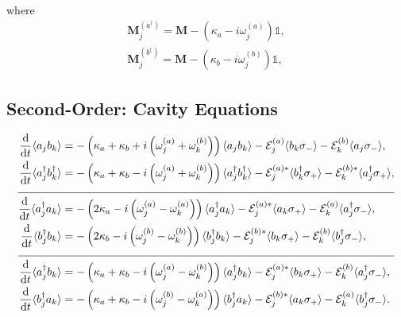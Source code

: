 \documentclass{article}
\newcommand{\ddt}[1][]{\frac{\mathrm{d} #1}{\mathrm{d}t}}
\begin{document}
where
\begin{subequations}
	\begin{gather}
		\bm{M}_{j}^{(a^{\dagger})} = \bm{M} - \left( \kappa_{a} - i \omega_{j}^{(a)} \right) \mathbb{1}, \\
		\bm{M}_{j}^{(b^{\dagger})} = \bm{M} - \left( \kappa_{b} - i \omega_{j}^{(b)} \right) \mathbb{1},
	\end{gather}
\end{subequations}

\subsection{Second-Order: Cavity Equations}

\begin{subequations}
	\begin{align}
		\ddt \langle a_{j} b_{k} \rangle &= -\left( \kappa_{a} + \kappa_{b} + i \left( \omega_{j}^{(a)} + \omega_{k}^{(b)} \right) \right) \langle a_{j} b_{k} \rangle - \mathcal{E}_{j}^{(a)} \langle b_{k} \sigma_{-} \rangle - \mathcal{E}_{k}^{(b)} \langle a_{j} \sigma_{-} \rangle, \\
		\ddt \langle a^{\dagger}_{j} b^{\dagger}_{k} \rangle &= -\left( \kappa_{a} + \kappa_{b} - i \left( \omega_{j}^{(a)} + \omega_{k}^{(b)} \right) \right) \langle a^{\dagger}_{j} b^{\dagger}_{k} \rangle - \mathcal{E}_{j}^{(a) *} \langle b^{\dagger}_{k} \sigma_{+} \rangle - \mathcal{E}_{k}^{(b) *} \langle a^{\dagger}_{j} \sigma_{+} \rangle, \\
		\cline{1-2}
		\ddt \langle a^{\dagger}_{j} a_{k} \rangle &= -\left( 2 \kappa_{a} - i \left( \omega_{j}^{(a)}- \omega_{k}^{(a)} \right) \right) \langle a^{\dagger}_{j} a_{k} \rangle - \mathcal{E}_{j}^{(a) *} \langle a_{k} \sigma_{+} \rangle - \mathcal{E}_{k}^{(a)} \langle a^{\dagger}_{j} \sigma_{-} \rangle, \\
		\ddt \langle b^{\dagger}_{j} b_{k} \rangle &= -\left( 2 \kappa_{b} - i \left( \omega_{j}^{(b)}- \omega_{k}^{(b)} \right) \right) \langle b^{\dagger}_{j} b_{k} \rangle - \mathcal{E}_{j}^{(b) *} \langle b_{k} \sigma_{+} \rangle - \mathcal{E}_{k}^{(b)} \langle b^{\dagger}_{j} \sigma_{-} \rangle, \\
		\cline{1-2}
		\ddt \langle a^{\dagger}_{j} b_{k} \rangle &= -\left( \kappa_{a} + \kappa_{b} - i \left( \omega_{j}^{(a)}- \omega_{k}^{(b)} \right) \right) \langle a^{\dagger}_{j} b_{k} \rangle - \mathcal{E}_{j}^{(a) *} \langle b_{k} \sigma_{+} \rangle - \mathcal{E}_{k}^{(b)} \langle a^{\dagger}_{j} \sigma_{-} \rangle, \\
		\ddt \langle b^{\dagger}_{j} a_{k} \rangle &= -\left( \kappa_{a} + \kappa_{b} - i \left( \omega_{j}^{(b)}- \omega_{k}^{(a)} \right) \right) \langle b^{\dagger}_{j} a_{k} \rangle - \mathcal{E}_{j}^{(b) *} \langle a_{k} \sigma_{+} \rangle - \mathcal{E}_{k}^{(a)} \langle b^{\dagger}_{j} \sigma_{-} \rangle.
	\end{align}
\end{subequations}
\end{document}
